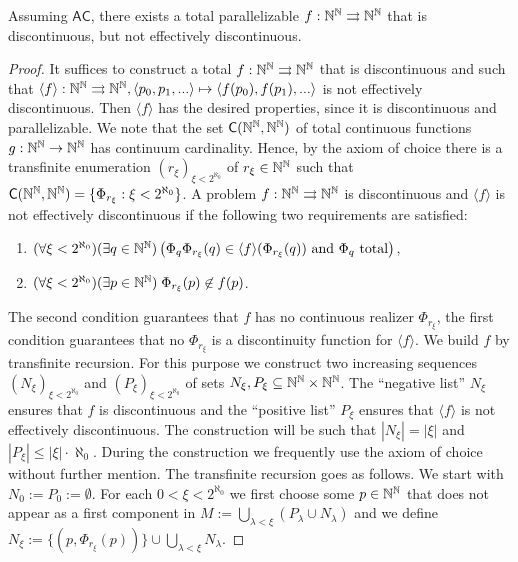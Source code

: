 \documentclass{amsart}
\def\IN{{\Bbb{N}}}
\def\In{\subseteq}
\def\mto{\rightrightarrows}
\def\C{{\mathsf{{C}}}}
\def\C{\mathsf{C}}
\def\AC{\mathsf{AC}}
\begin{document}
\begin{theorem}
\label{thm:AC}
Assuming $\AC$, there exists a total parallelizable $f:\IN^\IN\mto\IN^\IN$ that is discontinuous, but not 
effectively discontinuous.
\end{theorem}
\begin{proof}
It suffices to construct a total $f:\IN^\IN\mto\IN^\IN$ that is discontinuous and such that
$\langle f\rangle:\IN^\IN\mto\IN^\IN,\langle p_0,p_1,...\rangle\mapsto\langle f(p_0),f(p_1),...\rangle$ 
is not effectively discontinuous. Then $\langle f\rangle$ has the desired properties, since
it is discontinuous and parallelizable.   
We note that the set $\C(\IN^\IN,\IN^\IN)$ of total continuous functions $g:\IN^\IN\to\IN^\IN$ has continuum cardinality.
Hence, by the axiom of choice there is a transfinite enumeration $(r_\xi)_{\xi<2^{\aleph_0}}$ of $r_\xi\in\IN^\IN$
such that $\C(\IN^\IN,\IN^\IN)=\{\Phi_{r_\xi}:\xi<2^{\aleph_0}\}$.
A problem $f:\IN^\IN\mto\IN^\IN$ is discontinuous and $\langle f\rangle$ is not effectively discontinuous if 
the following two requirements are satisfied:
\begin{enumerate}
\item $(\forall \xi<2^{\aleph_0})(\exists q\in \IN^\IN)\left(\Phi_q\Phi_{r_\xi}(q)\in\langle f\rangle(\Phi_{r_\xi}(q))\mbox{ and }\Phi_q\mbox{ total}\right)$,
\item $(\forall \xi<2^{\aleph_0})(\exists p\in\IN^\IN)\;\Phi_{r_\xi}(p)\not\in f(p)$.
\end{enumerate}
The second condition guarantees that $f$ has no continuous realizer $\Phi_{r_\xi}$, the
first condition guarantees that no $\Phi_{r_\xi}$ is a discontinuity function for $\langle f\rangle$.
We build $f$ by transfinite recursion. 
For this purpose we construct two increasing sequences $(N_\xi)_{\xi<2^{\aleph_0}}$ and $(P_\xi)_{\xi<2^{\aleph_0}}$ 
of sets $N_\xi,P_\xi\In\IN^\IN\times\IN^\IN$. The ``negative list'' $N_\xi$ ensures that $f$ is discontinuous and
the ``positive list'' $P_\xi$ ensures that $\langle f\rangle$ is not effectively discontinuous.
The construction will be such that $|N_\xi|=|\xi|$ and $|P_\xi|\leq|\xi|\cdot\aleph_0$.
During the construction we frequently use the axiom of choice without further mention.
The transfinite recursion goes as follows.
We start with $N_0:=P_0:=\emptyset$.
 For each $0<\xi<2^{\aleph_0}$ we first choose
some $p\in\IN^\IN$ that does not appear as a first component in $M:=\bigcup_{\lambda<\xi}(P_\lambda\cup N_\lambda)$
and we define $N_\xi:=\{(p,\Phi_{r_\xi}(p))\}\cup\bigcup_{\lambda<\xi}N_\lambda$.

\end{proof}
\end{document}
